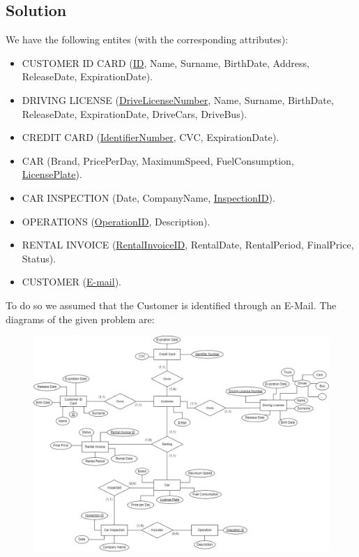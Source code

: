 \subsection*{Solution}
We have the following entites (with the corresponding attributes): 
\begin{itemize}
    \item CUSTOMER ID CARD (\underline{ID}, Name, Surname, BirthDate, Address, ReleaseDate, ExpirationDate). 
    \item DRIVING LICENSE (\underline{DriveLicenseNumber}, Name, Surname, BirthDate, ReleaseDate, ExpirationDate, DriveCars, DriveBus). 
    \item CREDIT CARD (\underline{IdentifierNumber}, CVC, ExpirationDate).
    \item CAR (Brand, PricePerDay, MaximumSpeed, FuelConsumption, \underline{LicensePlate}).
    \item CAR INSPECTION (Date, CompanyName, \underline{InspectionID}).
    \item OPERATIONS (\underline{OperationID}, Description). 
    \item RENTAL INVOICE (\underline{RentalInvoiceID}, RentalDate, RentalPeriod, FinalPrice, Status).
    \item CUSTOMER (\underline{E-mail}).
\end{itemize}
To do so we assumed that the Customer is identified through an E-Mail. 
The diagrams of the given problem are: 
\begin{figure}[H]
    \centering
    \includegraphics[width=1.00\linewidth]{images/er.png}
\end{figure}